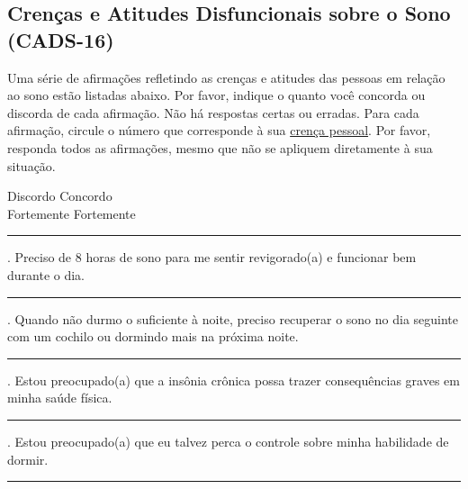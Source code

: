 \documentclass[
  ,doc,11pt, twoside,floatsintext]{apa6}
\begin{document}
\clearpage

\begin{appendix}
\section{Crenças e Atitudes Disfuncionais sobre o Sono (CADS-16)}
\label{cads-16}

Uma série de afirmações refletindo as crenças e atitudes das pessoas em relação ao sono estão listadas abaixo. Por favor, indique o quanto você concorda ou discorda de cada afirmação. Não há respostas certas ou erradas. Para cada afirmação, circule o número que corresponde à sua \underline{crença pessoal}. Por favor, responda todos as afirmações, mesmo que não se apliquem diretamente à sua situação.
\smallskip

\begin{flushleft}

{
\begin{center}
Discordo \hfill Concordo\\
Fortemente \hfill Fortemente
\end{center}

\medskip
\hrule
\medskip

\hspace*{6mm} \par

. Preciso de 8 horas de sono para me sentir revigorado(a) e funcionar bem durante o dia.
\medskip
\hrule
\medskip
\hspace*{6mm} \par


. Quando não durmo o suficiente à noite, preciso recuperar o sono no dia seguinte com um cochilo ou dormindo mais na próxima noite.
\medskip
\hrule
\medskip
\hspace*{6mm} \par

. Estou preocupado(a) que a insônia crônica possa trazer consequências graves em minha saúde física. 
\medskip
\hrule
\medskip
\hspace*{6mm} \par

. Estou preocupado(a) que eu talvez perca o controle sobre minha habilidade de dormir.
\medskip
\hrule
\medskip
\hspace*{6mm} \par

}
\end{flushleft}
\end{appendix}
\end{document}
